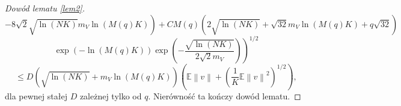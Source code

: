 \documentclass[man,mfiu]{mgrwms}
\newcommand{\norm}[1]{\left\lVert#1\right\rVert}
\begin{document}
\begin{proof}[Dowód lematu \ref{lem2}]
\begin{displaymath}
\end{displaymath}
\begin{displaymath}
\left.\left.-8\sqrt{2}\sqrt{\ln (NK)}m_V\ln (M(q)K)\right)+CM(q)\left(2\sqrt{\ln (NK)}+\sqrt{32}m_V\ln (M(q)K)+q\sqrt{32}\right)\right.
\end{displaymath}
\begin{displaymath}
\left. \exp\left(-\ln (M(q)K)\right)\exp \left(-\frac{\sqrt{\ln (NK)}}{2\sqrt{2}m_V}\right)\right)^{1/2}
\end{displaymath}
\begin{displaymath}
\leq D\left(\sqrt{\ln (NK)}+m_V\ln (M(q)K)\right)\left(\mathbb{E}\norm{v}+\left(\frac{1}{K}\mathbb{E}\norm{v}^2\right)^{1/2}\right),
\end{displaymath}
dla pewnej stałej $D$ zależnej tylko od $q$. Nierówność ta kończy dowód lematu.
\end{proof}
\end{document}
